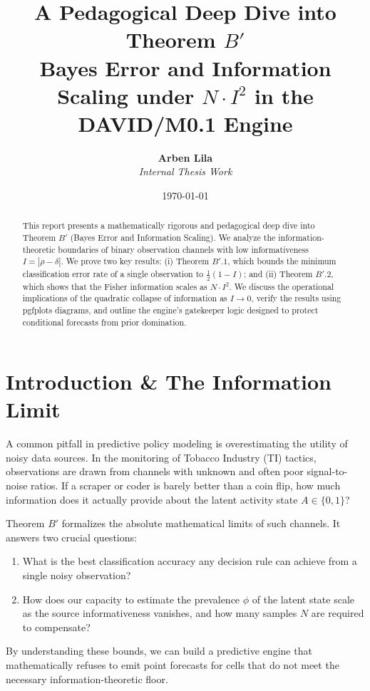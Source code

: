 \documentclass[11pt,a4paper]{article}
\title{\textbf{A Pedagogical Deep Dive into Theorem $B'$}\\
\large Bayes Error and Information Scaling under $N \cdot I^2$ in the DAVID/M0.1 Engine}
\author{\textbf{Arben Lila} \\ \textit{Internal Thesis Work}}
\date{\today}
\begin{document}
\maketitle

\begin{abstract}
This report presents a mathematically rigorous and pedagogical deep dive into Theorem $B'$ (Bayes Error and Information Scaling). We analyze the information-theoretic boundaries of binary observation channels with low informativeness $I = |\rho - \delta|$. We prove two key results: (i) Theorem $B'.1$, which bounds the minimum classification error rate of a single observation to $\frac{1}{2}(1-I)$; and (ii) Theorem $B'.2$, which shows that the Fisher information scales as $N \cdot I^2$. We discuss the operational implications of the quadratic collapse of information as $I \to 0$, verify the results using pgfplots diagrams, and outline the engine's gatekeeper logic designed to protect conditional forecasts from prior domination.
\end{abstract}

\tableofcontents
\newpage

\section{Introduction \& The Information Limit}
A common pitfall in predictive policy modeling is overestimating the utility of noisy data sources. In the monitoring of Tobacco Industry (TI) tactics, observations are drawn from channels with unknown and often poor signal-to-noise ratios. If a scraper or coder is barely better than a coin flip, how much information does it actually provide about the latent activity state $A \in \{0, 1\}$?

Theorem $B'$ formalizes the absolute mathematical limits of such channels. It answers two crucial questions:
\begin{enumerate}
    \item What is the best classification accuracy any decision rule can achieve from a single noisy observation?
    \item How does our capacity to estimate the prevalence $\phi$ of the latent state scale as the source informativeness vanishes, and how many samples $N$ are required to compensate?
\end{enumerate}

By understanding these bounds, we can build a predictive engine that mathematically refuses to emit point forecasts for cells that do not meet the necessary information-theoretic floor.
\end{document}
